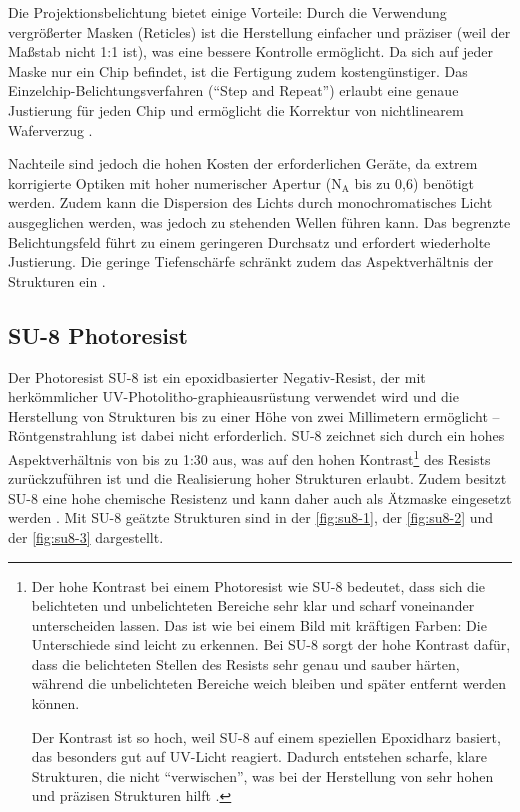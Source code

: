 \documentclass{article} %
\begin{document}
Die Projektionsbelichtung bietet einige Vorteile: Durch die Verwendung vergrößerter Masken (Reticles) ist die Herstellung einfacher und präziser (weil der Maßstab nicht 1:1 ist), was eine bessere Kontrolle ermöglicht. Da sich auf jeder Maske nur ein Chip befindet, ist die Fertigung zudem kostengünstiger. Das Einzelchip-Belichtungsverfahren (``Step and Repeat'') erlaubt eine genaue Justierung für jeden Chip und ermöglicht die Korrektur von nichtlinearem Waferverzug \cite{schmid2024}. 

\vspace{1em}

Nachteile sind jedoch die hohen Kosten der erforderlichen Geräte, da extrem korrigierte Optiken mit hoher numerischer Apertur ($\mathrm{N_A}$ bis zu 0,6) benötigt werden. Zudem kann die Dispersion des Lichts durch monochromatisches Licht ausgeglichen werden, was jedoch zu stehenden Wellen führen kann. Das begrenzte Belichtungsfeld führt zu einem geringeren Durchsatz und erfordert wiederholte Justierung. Die geringe Tiefenschärfe schränkt zudem das Aspektverhältnis der Strukturen ein \cite{schmid2024}.





\vspace{1em}

\subsection{SU-8 Photoresist} %

Der Photoresist SU-8 ist ein epoxidbasierter Negativ-Resist, der mit herkömmlicher UV-Photolitho-graphieausrüstung verwendet wird und die Herstellung von Strukturen bis zu einer Höhe von zwei Millimetern ermöglicht -- Röntgenstrahlung ist dabei nicht erforderlich. SU-8 zeichnet sich durch ein hohes Aspektverhältnis von bis zu 1:30 aus, was auf den hohen Kontrast\footnote{Der hohe Kontrast bei einem Photoresist wie SU-8 bedeutet, dass sich die belichteten und unbelichteten Bereiche sehr klar und scharf voneinander unterscheiden lassen. Das ist wie bei einem Bild mit kräftigen Farben: Die Unterschiede sind leicht zu erkennen. Bei SU-8 sorgt der hohe Kontrast dafür, dass die belichteten Stellen des Resists sehr genau und sauber härten, während die unbelichteten Bereiche weich bleiben und später entfernt werden können. 

Der Kontrast ist so hoch, weil SU-8 auf einem speziellen Epoxidharz basiert, das besonders gut auf UV-Licht reagiert. Dadurch entstehen scharfe, klare Strukturen, die nicht ``verwischen'', was bei der Herstellung von sehr hohen und präzisen Strukturen hilft \cite{Lorenz1997, Jensen2002, DelCampo2007}.} des Resists zurückzuführen ist und die Realisierung hoher Strukturen erlaubt. Zudem besitzt SU-8 eine hohe chemische Resistenz und kann daher auch als Ätzmaske eingesetzt werden \cite{schmid2024}. Mit SU-8 geätzte Strukturen sind in der \autoref{fig:su8-1}, der \autoref{fig:su8-2} und der \autoref{fig:su8-3} dargestellt. 
\end{document}
